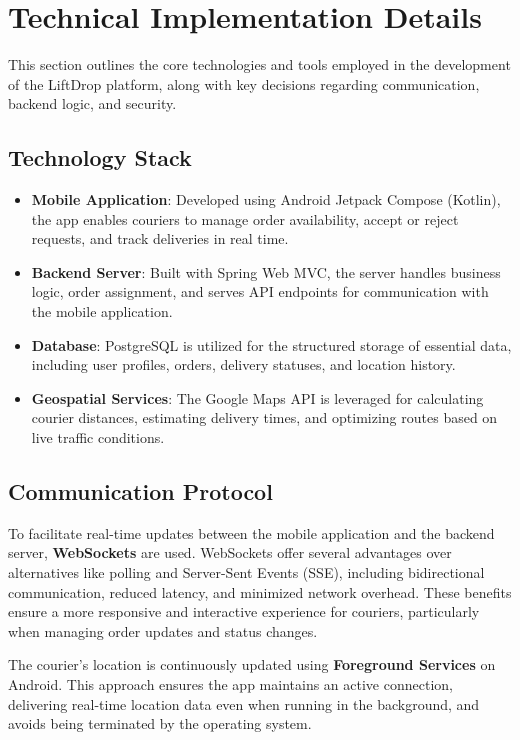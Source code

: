 \section{Technical Implementation Details}

This section outlines the core technologies and tools employed in the development of the LiftDrop platform, along with key decisions regarding communication, backend logic, and security.

\subsection{Technology Stack}
\begin{itemize}
    \item \textbf{Mobile Application}: Developed using Android Jetpack Compose (Kotlin), the app enables couriers to manage order availability, accept or reject requests, and track deliveries in real time.
    \item \textbf{Backend Server}: Built with Spring Web MVC, the server handles business logic, order assignment, and serves API endpoints for communication with the mobile application.
    \item \textbf{Database}: PostgreSQL is utilized for the structured storage of essential data, including user profiles, orders, delivery statuses, and location history.
    \item \textbf{Geospatial Services}: The Google Maps API is leveraged for calculating courier distances, estimating delivery times, and optimizing routes based on live traffic conditions.
\end{itemize}

\subsection{Communication Protocol}

To facilitate real-time updates between the mobile application and the backend server, \textbf{WebSockets} are used. WebSockets offer several advantages over alternatives like polling and Server-Sent Events (SSE), including bidirectional communication, reduced latency, and minimized network overhead. These benefits ensure a more responsive and interactive experience for couriers, particularly when managing order updates and status changes.

The courier's location is continuously updated using \textbf{Foreground Services} on Android. This approach ensures the app maintains an active connection, delivering real-time location data even when running in the background, and avoids being terminated by the operating system.

